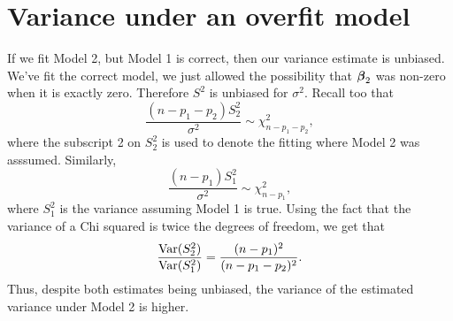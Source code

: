 \section{Variance under an overfit model}
If we fit Model 2, but Model 1 is correct, then our variance estimate is 
unbiased. We've fit the correct model, we just allowed the possibility that
$\boldsymbol{\beta}_2$ was non-zero when it is exactly zero. Therefore $S^2$ is unbiased
for $\sigma^2$. Recall too that
$$
\frac{(n-p_1 - p_2)S^2_2}{\sigma^2} \sim \chi^2_{n-p_1 - p_2},
$$
where the subscript 2 on $S^2_2$ is used to denote the fitting where Model 2 was asssumed.
Similarly,
$$
 \frac{(n-p_1)S^2_1}{\sigma^2} \sim \chi^2_{n-p_1},
$$
where $S_1^2$ is the variance assuming Model 1 is true. Using the fact that the variance
of a Chi squared is twice the degrees of freedom, we get that
$$
\frac{\mbox{Var}(S_2^2)}{\mbox{Var}(S_1^2)} = \frac{(n - p_1)^2}{(n - p_1 - p_2)^2}.
$$
Thus, despite both estimates being unbiased, the variance of the estimated variance
under Model 2 is higher.


